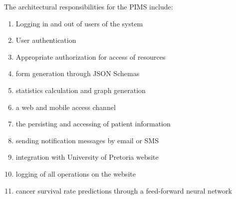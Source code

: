 The architectural responsibilities for the PIMS include:
\begin{enumerate}
	\item Logging in and out of users of the system
	\item User authentication
	\item Appropriate authorization for  access of resources
	\item form generation through JSON Schemas
	\item statistics calculation and graph generation
	\item a web and mobile access channel
	\item the persisting and accessing of patient information
	\item sending notification messages by email or SMS
	\item integration with University of Pretoria website
	\item logging of all operations on the website
	\item cancer survival rate predictions through a feed-forward neural network
\end{enumerate}